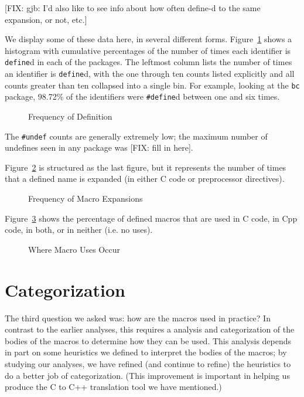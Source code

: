 [FIX: gjb: I'd also like to see info about how often define-d to the same
expansion, or not, etc.]


We display some of these data here, in several different forms.
Figure~\ref{fig:define_count} shows a histogram with cumulative
percentages of the number of times each identifier is \verb+define+d
in each of the packages.  The leftmost column lists the number of
times an identifier is \verb+define+d, with the one through ten counts
listed explicitly and all counts greater than ten collapsed into a
single bin.  For example, looking at the \verb+bc+ package, 98.72\% of
the identifiers were \verb+#define+d between one and six times.

\begin{figure}

\caption{Frequency of Definition\label{fig:define_count}}
\end{figure}

The \verb+#undef+ counts are generally extremely low; the maximum
number of undefines seen in any package was [FIX: fill in here].

Figure~\ref{fig:use_count} is structured as the last figure, but it
represents the number of times that a defined name is expanded (in
either C code or preprocessor directives).

\begin{figure}

\caption{Frequency of Macro Expansions\label{fig:use_count}}
\end{figure}

Figure~\ref{fig:define_usage} shows the percentage of defined macros
that are used in C code, in Cpp code, in both, or in neither (i.e. no
uses).

\begin{figure}

\caption{Where Macro Uses Occur\label{fig:define_usage}}
\end{figure}


\section{Categorization}\label{sec:categorization}

The third question we asked was: how are the macros used in practice?
In contrast to the earlier analyses, this requires a analysis and
categorization of the bodies of the macros to determine how they can
be used.  This analysis depends in part on some heuristics we defined
to interpret the bodies of the macros; by studying our analyses, we
have refined (and continue to refine) the heuristics to do a better
job of categorization.  (This improvement is important in helping us
produce the C to C++ translation tool we have mentioned.)

